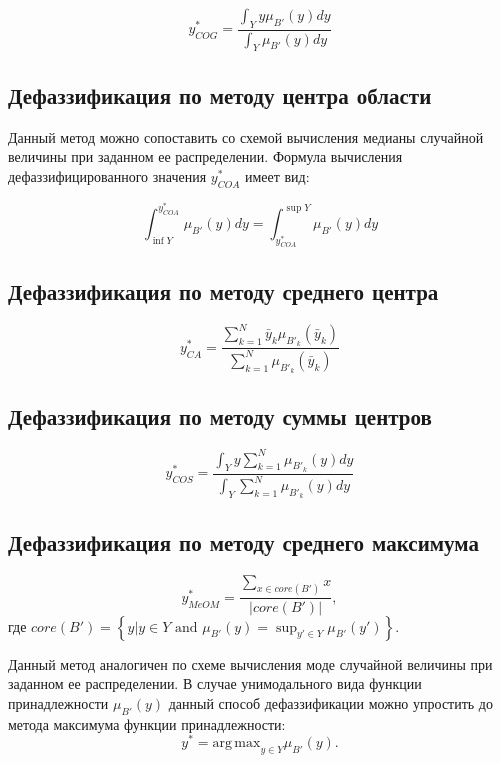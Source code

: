 \begin{equation*}
y^*_{COG} = \frac{\int_Y y \mu_{B'}(y) dy}{\int_Y \mu_{B'}(y) dy}
\end{equation*}

\subsection{Дефаззификация по методу центра области}

Данный метод можно сопоставить со схемой вычисления медианы случайной величины при заданном ее распределении. Формула вычисления дефаззифицированного значения $y^*_{COA}$ имеет вид:

\begin{equation*}
\int_{\inf Y}^{y^*_{COA}} \mu_{B'}(y) dy = \int_{y^*_{COA}}^{\sup Y} \mu_{B'}(y) dy
\end{equation*}

\subsection{Дефаззификация по методу среднего центра}

\begin{equation*}
y^*_{CA} = \frac{\sum_{k=1}^{N} \bar{y}_k \mu_{B'_k}(\bar{y}_k)}{\sum_{k=1}^{N} \mu_{B'_k}(\bar{y}_k)}
\end{equation*}

\subsection{Дефаззификация по методу суммы центров}

\cite{rutkovskiy2010}

\begin{equation*}
y^*_{COS} = \frac{\int_Y y \sum_{k=1}^{N} \mu_{B'_k}(y) dy}{\int_Y \sum_{k=1}^{N} \mu_{B'_k}(y) dy}
\end{equation*}

\subsection{Дефаззификация по методу среднего максимума}

\begin{equation*}
y^*_{MeOM} = \frac{\sum_{x \in core(B')} x}{|core(B')|},
\end{equation*}
где $core(B') = \left\{y | y \in Y \textrm{ and } \mu_{B'}(y) = \sup_{y' \in Y} \mu_{B'}(y')\right\}$. 

Данный метод аналогичен по схеме вычисления моде случайной величины при заданном ее распределении. В случае унимодального вида функции принадлежности $\mu_{B'}(y)$ данный способ дефаззификации можно упростить до метода максимума функции принадлежности:
\[
y^* = \mathrm{arg\,max}_{y \in Y} \mu_{B'}(y).
\]

